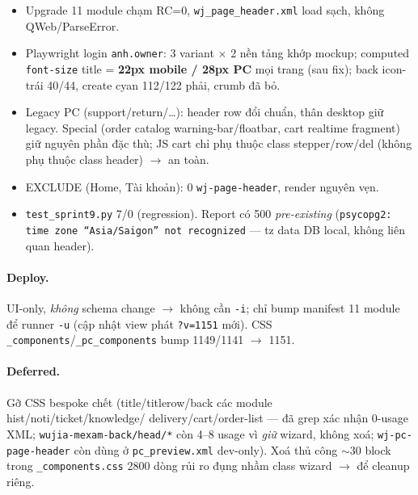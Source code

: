 \begin{itemize}
\item Upgrade 11 module chạm RC=0, \texttt{wj\_page\_header.xml} load sạch, không QWeb/ParseError.
\item Playwright login \texttt{anh.owner}: 3 variant $\times$ 2 nền tảng khớp mockup; computed
      \texttt{font-size} title = \textbf{22px mobile / 28px PC} mọi trang (sau fix); back icon-trái
      40/44, create cyan 112/122 phải, crumb đã bỏ.
\item Legacy PC (support/return/\ldots): header row đổi chuẩn, thân desktop giữ legacy. Special
      (order catalog warning-bar/floatbar, cart realtime fragment) giữ nguyên phần đặc thù; JS cart chỉ
      phụ thuộc class stepper/row/del (không phụ thuộc class header) $\rightarrow$ an toàn.
\item EXCLUDE (Home, Tài khoản): 0 \texttt{wj-page-header}, render nguyên vẹn.
\item \texttt{test\_sprint9.py} 7/0 (regression). Report có 500 \emph{pre-existing} (\texttt{psycopg2:
      time zone ``Asia/Saigon'' not recognized} --- tz data DB local, không liên quan header).
\end{itemize}

\paragraph{Deploy.} UI-only, \emph{không} schema change $\rightarrow$ không cần \texttt{-i}; chỉ bump
manifest 11 module để runner \texttt{-u} (cập nhật view phát \texttt{?v=1151} mới). CSS
\texttt{\_components}/\texttt{\_pc\_components} bump 1149/1141 $\rightarrow$ 1151.

\paragraph{Deferred.} Gỡ CSS bespoke chết (title/titlerow/back các module hist/noti/ticket/knowledge/
delivery/cart/order-list --- đã grep xác nhận 0-usage XML; \texttt{wujia-mexam-back/head/*} còn 4--8
usage vì \emph{giữ} wizard, không xoá; \texttt{wj-pc-page-header} còn dùng ở \texttt{pc\_preview.xml}
dev-only). Xoá thủ công $\sim$30 block trong \texttt{\_components.css} 2800 dòng rủi ro đụng nhầm class
wizard $\rightarrow$ để cleanup riêng.

